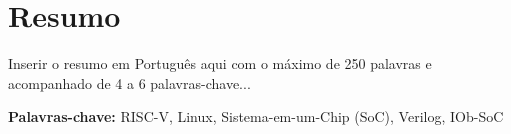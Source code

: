 \cleardoubleoddpage

\chapter*{Resumo}
\thispagestyle{empty} %

Inserir o resumo em Portugu\^{e}s aqui com o máximo de 250 palavras e acompanhado de 4 a 6 palavras-chave...

\vfill

\textbf{\Large Palavras-chave:} RISC-V, Linux, Sistema-em-um-Chip (SoC), Verilog, IOb-SoC

